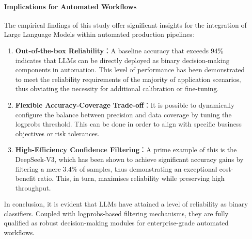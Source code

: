 \paragraph{Implications for Automated Workflows}
The empirical findings of this study offer significant insights for the integration of Large Language Models within automated production pipelines:
\begin{enumerate}
\item \textbf{Out-of-the-box Reliability}：A baseline accuracy that exceeds 94\% indicates that LLMs can be directly deployed as binary decision-making components in automation. This level of performance has been demonstrated to meet the reliability requirements of the majority of application scenarios, thus obviating the necessity for additional calibration or fine-tuning.
\item \textbf{Flexible Accuracy-Coverage Trade-off}：It is possible to dynamically configure the balance between precision and data coverage by tuning the logprobs threshold. This can be done in order to align with specific business objectives or risk tolerances.
\item \textbf{High-Efficiency Confidence Filtering}：A prime example of this is the DeepSeek-V3, which has been shown to achieve significant accuracy gains by filtering a mere 3.4\% of samples, thus demonstrating an exceptional cost-benefit ratio. This, in turn, maximises reliability while preserving high throughput.
\end{enumerate}

In conclusion, it is evident that LLMs have attained a level of reliability as binary classifiers. Coupled with logprobs-based filtering mechanisms, they are fully qualified as robust decision-making modules for enterprise-grade automated workflows.
